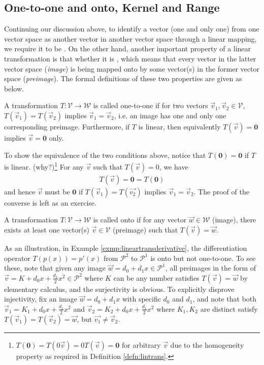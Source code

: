 \subsection{One-to-one and onto, Kernel and Range}

Continuing our discussion above, to identify a vector (one and only one) from one vector space as another vector in another vector space through a linear mapping, we require it to be . On the other hand, another important property of a linear transformation is that whether it is , which means that every vector in the latter vector space (\textit{image}) is being mapped onto by some vector(s) in the former vector space (\textit{preimage}). The formal definitions of these two properties are given as below.

\begin{proper}
\label{proper:injective}
A transformation $T: \mathcal{V} \to \mathcal{W}$ is called one-to-one if for two vectors $\vec{v}_1, \vec{v}_2 \in \mathcal{V}$, $T(\vec{v}_1) = T(\vec{v}_2)$ implies $\vec{v}_1 = \vec{v}_2$, i.e. an image has one and only one corresponding preimage. Furthermore, if $T$ is linear, then equivalently $T(\vec{v}) = \textbf{0}$ implies $\vec{v} = \textbf{0}$ only.
\end{proper}
To show the equivalence of the two conditions above, notice that $T(\textbf{0}) = \textbf{0}$ if $T$ is linear. (why?)\footnote{$T(\textbf{0})=T(0\vec{v})=0T(\vec{v})=\textbf{0}$ for arbitrary $\vec{v}$ due to the homogeneity property as required in Definition \ref{defn:lintrans}.} For any $\vec{v}$ such that $T(\vec{v}) = 0$, we have
\begin{align*}
T(\vec{v}) = \textbf{0} = T(\textbf{0})
\end{align*}
and hence $\vec{v}$ must be $\textbf{0}$ if $T(\vec{v}_1) = T(\vec{v_2})$ implies $\vec{v}_1 = \vec{v}_2$. The proof of the converse is left as an exercise.
\begin{proper}
\label{proper:surjective}
A transformation $T: \mathcal{V} \to \mathcal{W}$ is called onto if for any vector $\vec{w} \in \mathcal{W}$ (image), there exists at least one vector(s) $\vec{v} \in \mathcal{V}$ (preimage) such that $T(\vec{v}) = \vec{w}$.
\end{proper}
As an illustration, in Example \ref{exmp:lineartransderivative}, the differentiation operator $T(p(x)) = p'(x)$ from $\mathcal{P}^2$ to $\mathcal{P}^1$ is onto but not one-to-one. To see these, note that given any image $\vec{w} = d_0 + d_1x \in \mathcal{P}^1$, all preimages in the form of $\vec{v} = K + d_0x + \frac{d_1}{2}x^2\in \mathcal{P}^2$ where $K$ can be any number satisfies $T(\vec{v}) = \vec{w}$ by elementary calculus, and the surjectivity is obvious. To explicitly disprove injectivity, fix an image $\vec{w} = d_0 + d_1x$ with specific $d_0$ and $d_1$, and note that both $\vec{v}_1 = K_1 + d_0x + \frac{d_1}{2}x^2$ and $\vec{v}_2 = K_2 + d_0x + \frac{d_1}{2}x^2$ where $K_1, K_2$ are distinct satisfy $T(\vec{v}_1) = T(\vec{v}_2) = \vec{w}$, but $\vec{v_1} \neq \vec{v}_2$.

